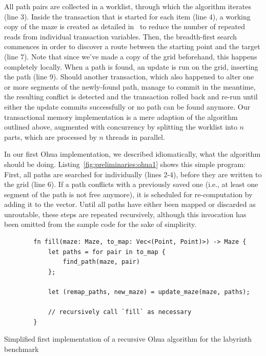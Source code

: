 All path pairs are collected in a worklist, through which the algorithm iterates (line 3).
Inside the transaction that is started for each item (line 4), a working copy of the maze is created as detailed in~\cite{swalens2016transactional} to reduce the number of repeated reads from individual transaction variables.
Then, the breadth-first search commences in order to discover a route between the starting point and the target (line 7).
Note that since we've made a copy of the grid beforehand, this happens completely locally.
When a path is found, an update is run on the grid, inserting the path (line 9).
Should another transaction, which also happened to alter one or more segments of the newly-found path, manage to commit in the meantime, the resulting conflict is detected and the transaction rolled back and re-run until either the update commits successfully or no path can be found anymore.
Our transactional memory implementation is a mere adaption of the algorithm outlined above, augmented with concurrency by splitting the worklist into $n$ parts, which are processed by $n$ threads in parallel.

In our first Ohua implementation, we described idiomatically, what the algorithm should be doing.
Listing~\ref{fig:preliminaries:ohua1} shows this simple program: First, all paths are searched for individually (lines 2-4), before they are written to the grid (line 6).
If a path conflicts with a previously saved one (i.e., at least one segment of the path is not free anymore), it is scheduled for re-computation by adding it to the  vector.
Until all paths have either been mapped or discarded as unroutable, these steps are repeated recursively, although this invocation has been omitted from the sample code for the sake of simplicity.

\begin{listing}[t]
    \begin{verbatim}
        fn fill(maze: Maze, to_map: Vec<(Point, Point)>) -> Maze {
            let paths = for pair in to_map {
                find_path(maze, pair)
            };

            let (remap_paths, new_maze) = update_maze(maze, paths);

            // recursively call `fill` as necessary
        }
    \end{verbatim}
    \caption{Simplified first implementation of a recursive Ohua algorithm for the labyrinth benchmark}%
    \label{fig:preliminaries:ohua1}
\end{listing}

